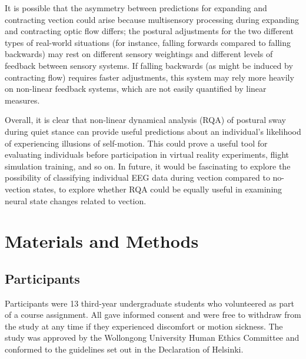 \documentclass[11pt]{article}
\begin{document}
\begin{linenumbers}
It is possible that the asymmetry between predictions for expanding and contracting vection could arise because multisensory processing during expanding and contracting optic flow differs; the postural adjustments for the two different types of real-world situations (for instance, falling forwards compared to falling backwards) may rest on different sensory weightings and different levels of feedback between sensory systems. If falling backwards (as might be induced by contracting flow) requires faster adjustments, this system may rely more heavily on non-linear feedback systems, which are not easily quantified by linear measures. %

Overall, it is clear that non-linear dynamical analysis (RQA) of postural sway during quiet stance  can provide useful predictions about an individual's likelihood of experiencing illusions of self-motion. This could prove a useful tool for evaluating individuals before participation in virtual reality experiments, flight simulation training, and so on. In future, it would be fascinating to explore the possibility of classifying individual EEG data during vection compared to no-vection states, to explore whether RQA could be equally useful in examining neural state changes related to vection. %



\section*{Materials and Methods}

\subsection*{Participants}
Participants were 13 third-year undergraduate students who volunteered as part of a course assignment. All gave informed consent and were free to withdraw from the study at any time if they experienced discomfort or motion sickness. The study was approved by the Wollongong University Human Ethics Committee and conformed to the guidelines set out in the Declaration of Helsinki. 


\end{linenumbers}
\end{document}
